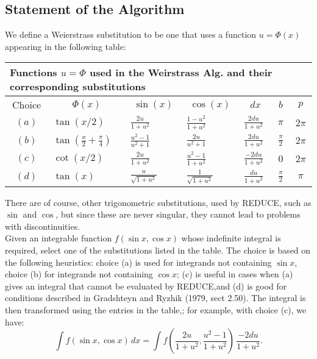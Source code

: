 \subsection{Statement of the Algorithm}
We define a Weierstrass substitution to be one that uses a function $u=\Phi(x)$ appearing in the following table: \\
%
\begin{tabular}{|c|p{1in}|p{0.5in}|p{0.5in}|p{0.5in}|c|c||} \hline 
\multicolumn{7}{|l|}{Functions $u=\Phi$ used in the Weirstrass Alg. and their corresponding substitutions} \\ \hline
\multicolumn{1}{|c|}{Choice} 
&\multicolumn{1}{|c|}{  $\Phi(x)$  } 
&\multicolumn{1}{|c|}{  $\sin(x)$  } 
&\multicolumn{1}{|c|}{  $\cos(x)$  } 
&\multicolumn{1}{|c|}{  $dx$  } 
&\multicolumn{1}{|c|}{  $b$  } 
&\multicolumn{1}{|c|}{  $p$  }  \\  \hline
$(a)$  & $\tan(x/2)$ & $\frac{2u}{1+u^{2}}$ & $ \frac{1-u^{2}}{1+u^{2}}$ & $\frac{2du}{1+u^{2}}$ & $\pi$ & $2\pi$ \\ \hline
$(b)$  & $\tan(\frac{x}{2}+\frac{\pi}{4})$ & $\frac{u^{2}-1}{u^{2}+1}$ & $\frac{2u}{u^{2}+1} $ & $\frac{2du}{1+u^{2}}$ & $\frac{\pi}{2}$ & $2\pi$ \\ \hline
$(c)$ & $\cot(x/2)$ & $\frac{2u}{1+u^{2}}$ & $\frac{u^{2}-1}{1+u^{2}}$ & $\frac{-2du}{1+u^{2}}$ & $0$ & $2\pi$ \\ \hline
$(d)$ & $\tan(x)$ & $\frac{u}{\sqrt{1+u^{2}}}$ & $\frac{1}{\sqrt{1+u^{2}}}$ & $\frac{du}{1+u^{2}}$ & $\frac{\pi}{2}$ & $\pi$ \\ \hline         
\end{tabular} \vspace{4mm}

There are of course, other trigonometric substitutions, used by \small{REDUCE}, \normalsize such as $\sin$ and $\cos$, but since these are never singular, they cannot lead to problems with discontinuities. \\
Given an integrable function $f(\sin x,\cos x)$ whose indefinite integral is required, select one of the substitutions listed in the table. The choice is based on the following heuristics: choice (a) is used for integrands not containing $\sin x$, choice (b) for integrands not containing $\cos x$; (c) is useful in cases when (a) gives an integral that cannot be evaluated by \small{REDUCE},\normalsize and (d) is good for conditions described in Gradshteyn and Ryzhik (1979, sect 2.50). The integral is then transformed using the entries in the table,; for example, with choice (c), we have:
\[ \int f(\sin x,\cos x)\, dx = \int f(\frac{2u}{1+u^{2}},\frac{u^{2}-1}{1+u^{2}})\,\frac{-2 du}{1+u^{2}} . \]

